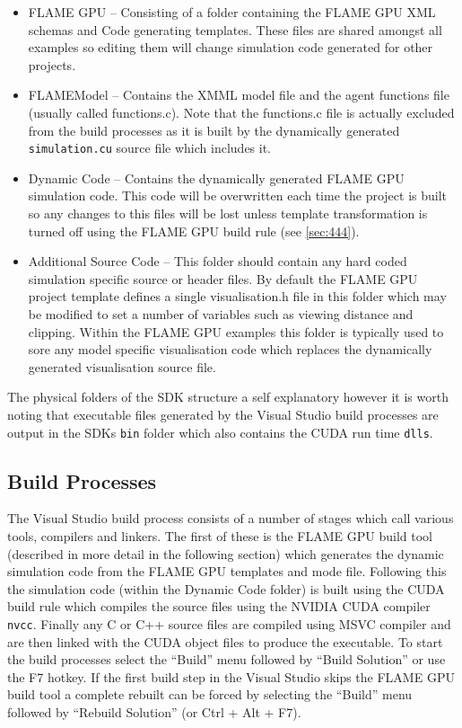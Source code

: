 \documentclass[11pt, a4paper, onecolumn, oneside]{report}
\begin{document}
\begin{itemize}
    \item FLAME GPU -- Consisting of a folder containing the FLAME GPU XML schemas and Code generating templates. These files are shared amongst all examples so editing them will change simulation code generated for other projects.
    \item FLAMEModel -- Contains the XMML model file and the agent functions file (usually called functions.c).
        Note that the functions.c file is actually excluded from the build processes as it is built by the dynamically generated \texttt{simulation.cu} source file which includes it.
    \item Dynamic Code -- Contains the dynamically generated FLAME GPU simulation code.
        This code will be overwritten each time the project is built so any changes to this files will be lost unless template transformation is turned off using the FLAME GPU build rule (see \cref{sec:444}).
    \item Additional Source Code -- This folder should contain any hard coded simulation specific source or header files.
        By default the FLAME GPU project template defines a single visualisation.h file in this folder which may be modified to set a number of variables such as viewing distance and clipping.
        Within the FLAME GPU examples this folder is typically used to sore any model specific visualisation code which replaces the dynamically generated visualisation source file.
\end{itemize}

The physical folders of the SDK structure a self explanatory however it is worth noting that executable files generated by the Visual Studio build processes are output in the SDKs \verb|bin| folder which also contains the CUDA run time \verb|dlls|. 


\subsection{Build Processes}
\label{sec:443}

The Visual Studio build process consists of a number of stages which call various tools, compilers and linkers.
The first of these is the FLAME GPU build tool (described in more detail in the following section) which generates the dynamic simulation code from the FLAME GPU templates and mode file.
Following this the simulation code (within the Dynamic Code folder) is built using the CUDA build rule which compiles the source files using the NVIDIA CUDA compiler 
\verb|nvcc|.
Finally any C or C++ source files are compiled using MSVC compiler and are then linked with the CUDA object files to produce the executable.
To start the build processes select the ``Build'' menu followed by ``Build Solution'' or use the F7 hotkey.
If the first build step in the Visual Studio skips the FLAME GPU build tool a complete rebuilt can be forced by selecting the ``Build'' menu followed by ``Rebuild Solution'' (or Ctrl + Alt + F7).
\end{document}
